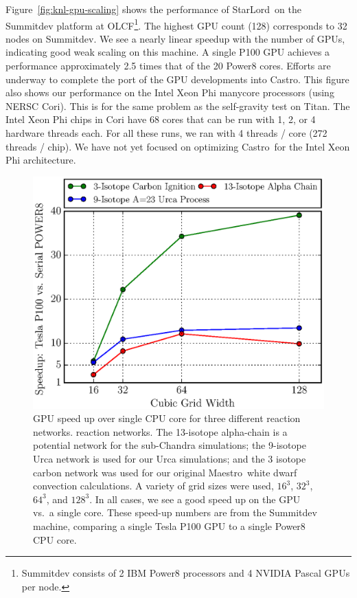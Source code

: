 \documentclass[a4paper]{jpconf}
\newcommand{\maestro}{{\sffamily Maestro}}
\newcommand{\castro}{{\sffamily Castro}}
\newcommand{\starlord}{{\sffamily StarLord}}
\begin{document}
Figure~\ref{fig:knl-gpu-scaling} shows the performance of
\starlord\ on the Summitdev platform at OLCF\footnote{Summitdev
  consists of 2 IBM Power8 processors and 4 NVIDIA Pascal GPUs per
  node.}.  The highest GPU count (128) corresponds to 32 nodes on
Summitdev.  We see a nearly linear speedup with the number of GPUs,
indicating good weak scaling on this machine. A single P100 GPU achieves
a performance approximately 2.5 times that of the 20 Power8 cores. Efforts are underway to
complete the port of the GPU developments into \castro.  This figure
also shows our performance on the Intel Xeon Phi manycore processors (using
NERSC Cori).  This is for the same problem as the self-gravity test on
Titan.  The Intel Xeon Phi chips in Cori
have 68 cores that can be run with 1, 2, or 4 hardware threads each.
For all these runs, we ran with 4 threads / core (272
threads / chip).  We have not yet focused on optimizing \castro\ for the
Intel Xeon Phi architecture.

\begin{figure}[t]
\centering
\includegraphics[width=0.48\linewidth]{cuda-vode-speedup}
\begin{minipage}[b]{0.48\linewidth}
\caption{\label{fig:cudaode} GPU speed up over single CPU core for three
  different reaction networks.
  reaction networks.  The 13-isotope alpha-chain is a
  potential network for the sub-Chandra simulations;
  the 9-isotope Urca network is used for our Urca simulations;
  and the 3 isotope carbon network was used for our original \maestro\
  white dwarf convection calculations.  A
  variety of grid sizes were used, $16^3$, $32^3$, $64^3$, and
  $128^3$.  In all cases, we see a good  speed up on the GPU
  vs.\ a single core.  These speed-up numbers are from the
  Summitdev machine, comparing a single Tesla P100 GPU to a single Power8 CPU core.}
\end{minipage}
\end{figure}
\end{document}
